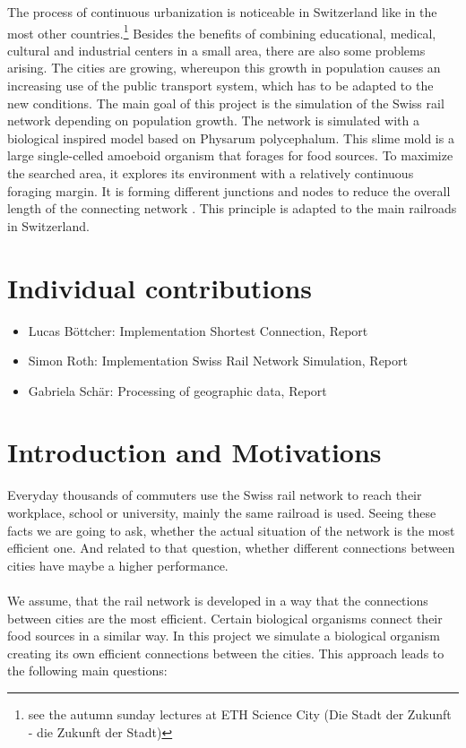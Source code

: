 \documentclass[11pt]{scrartcl}
\begin{document}
The process of continuous urbanization is noticeable in Switzerland like in the most other countries.\footnote[1]{see the autumn sunday lectures at ETH Science City (Die Stadt der Zukunft - die Zukunft der Stadt)} Besides the benefits of combining educational, medical, cultural and industrial centers in a small area, there are also some problems arising. The cities are growing, whereupon this growth in population causes an increasing use of the public transport system, which has to be adapted to the new conditions. The main goal of this project is the simulation of the Swiss rail network depending on population growth. The network is simulated with a biological inspired model based on Physarum polycephalum. This slime mold is a large single-celled amoeboid organism that forages for food sources. To maximize the searched area, it explores its environment with a relatively continuous foraging margin. It is forming different junctions and nodes to reduce the overall length of the connecting network \cite{network_tokyo}. This principle is adapted to the main railroads in Switzerland. 

\section{Individual contributions}
\begin{itemize}
  \item Lucas Böttcher: Implementation Shortest Connection, Report
  \item Simon Roth: Implementation Swiss Rail Network Simulation, Report
  \item Gabriela Schär: Processing of geographic data, Report
\end{itemize}


\section{Introduction and Motivations}
\label{sec:introduction}
Everyday thousands of commuters use the Swiss rail network to reach their workplace, school or university, mainly the same railroad is used. Seeing these facts we are going to ask, whether the actual situation of the network is the most efficient one. And related to that question, whether different connections between cities have maybe a higher performance.\\
\\
We assume, that the rail network is developed in a way that the connections between cities are the most efficient. Certain biological organisms connect their food sources in a similar way. In this project we simulate a biological organism creating its own efficient connections between the cities. This approach leads to the following main questions:
\end{document}

